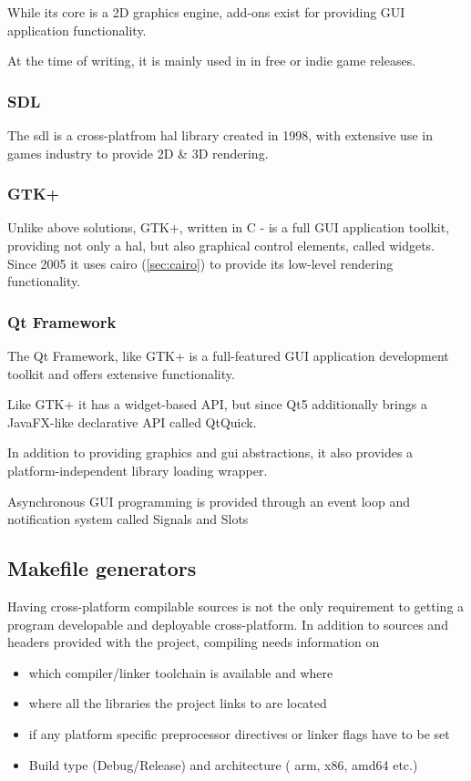 While its core is a 2D graphics engine, add-ons exist for providing GUI application functionality.  

At the time of writing, it is mainly used in in free or indie game releases.

\subsubsection{SDL}
The \gls{sdl} is a cross-platfrom \gls{hal} library created in 1998, with extensive use in games industry to provide 2D \& 3D rendering.

\subsubsection{GTK+}
Unlike above solutions, GTK+, written in C - is a full GUI application toolkit, providing not only a \gls{hal}, but also graphical control elements, called widgets. Since 2005 it uses cairo (\ref{sec:cairo}) to provide its low-level rendering functionality.

\subsubsection{Qt Framework}
The Qt Framework, like GTK+ is a full-featured GUI application development toolkit and offers extensive functionality.

Like GTK+ it has a widget-based API, but since Qt5 additionally brings a JavaFX-like declarative API called QtQuick.

In addition to providing graphics and \gls{gui} abstractions, it also provides a platform-independent library loading wrapper.

Asynchronous GUI programming is provided through an event loop and notification system called Signals and Slots

\subsection{Makefile generators}
Having cross-platform compilable sources is not the only requirement to getting a program developable and deployable cross-platform.
In addition to sources and headers provided with the project, compiling needs information on 
\begin{itemize}
	\item which compiler/linker toolchain is available and where
	\item where all the libraries the project links to are located
	\item if any platform specific preprocessor directives or linker flags have to be set
	\item Build type (Debug/Release) and architecture ( arm, x86, amd64 etc.)
\end{itemize}

